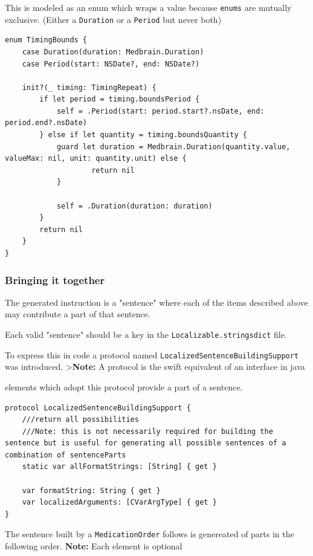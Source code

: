 \documentclass{article}
\begin{document}
This is modeled as an enum which wraps a value because \texttt{enums} are mutually
exclusive. (Either a \texttt{Duration} or a \texttt{Period} but never
both)

\begin{verbatim}
enum TimingBounds {
    case Duration(duration: Medbrain.Duration)
    case Period(start: NSDate?, end: NSDate?)

    init?(_ timing: TimingRepeat) {
        if let period = timing.boundsPeriod {
            self = .Period(start: period.start?.nsDate, end: period.end?.nsDate)
        } else if let quantity = timing.boundsQuantity {
            guard let duration = Medbrain.Duration(quantity.value, valueMax: nil, unit: quantity.unit) else {
                    return nil
            }

            self = .Duration(duration: duration)
        }
        return nil
    }
}
\end{verbatim}

\subsubsection{Bringing it together}\label{bringing-it-together}
The generated instruction is a "sentence" where each of the items
described above may contribute a part of that sentence.

Each valid "sentence" should be a key in the
\texttt{Localizable.stringsdict} file.

To express this in code a protocol named
\texttt{LocalizedSentenceBuildingSupport} was introduced.
\textgreater{}\textbf{Note:} A protocol is the swift equivalent of an
interface in java

elements which adopt this protocol provide a part of a sentence.

\begin{verbatim}
protocol LocalizedSentenceBuildingSupport {
    ///return all possibilities
    ///Note: this is not necessarily required for building the sentence but is useful for generating all possible sentences of a combination of sentenceParts
    static var allFormatStrings: [String] { get }

    var formatString: String { get }
    var localizedArguments: [CVarArgType] { get }
}
\end{verbatim}

The sentence built by a \texttt{MedicationOrder} follows is genereated of parts in the following
order. \textbf{Note:} Each element is optional
\end{document}
